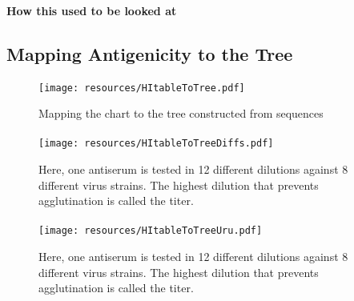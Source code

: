 \documentclass{beamer}
\begin{document}
\begin{darkframes}
    \begin{frame}{\subsecname}
      \framesubtitle{How this used to be looked at}
    \end{frame}

    \subsection{Mapping Antigenicity to the Tree}

    \begin{frame}{\subsecname}
      \framesubtitle{}
      \begin{figure}
        \texttt{[image: resources/HItableToTree.pdf]}
        \caption{\footnotesize Mapping the chart to the tree constructed from sequences}
      \end{figure}
    \end{frame}

    \begin{frame}{\subsecname}
      \framesubtitle{}
      \begin{figure}
        \texttt{[image: resources/HItableToTreeDiffs.pdf]}
        \caption{\footnotesize Here, one antiserum is tested in 12 different dilutions against 8 different virus strains. The highest dilution that prevents agglutination is called the titer.}
      \end{figure}
    \end{frame}

    \begin{frame}{\subsecname}
      \framesubtitle{}
      \begin{figure}
        \texttt{[image: resources/HItableToTreeUru.pdf]}
        \caption{\footnotesize Here, one antiserum is tested in 12 different dilutions against 8 different virus strains. The highest dilution that prevents agglutination is called the titer.}
      \end{figure}
    \end{frame}


\end{darkframes}
\end{document}
